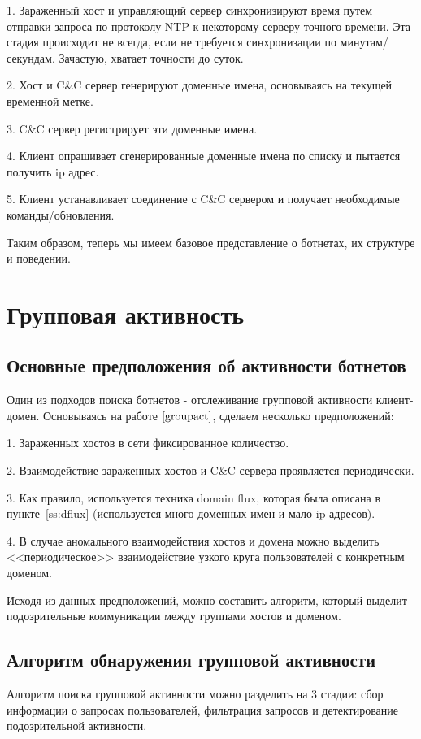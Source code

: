 \documentclass[a4paper,14pt]{extreport} %
\begin{document}
1. Зараженный хост и управляющий сервер синхронизируют время путем отправки запроса по протоколу NTP к некоторому серверу точного времени. Эта стадия происходит не всегда, если не требуется синхронизации по минутам/секундам. Зачастую, хватает точности до суток.
	
2. Хост и C\&C сервер генерируют доменные имена, основываясь на текущей временной метке.
	
3. C\&C сервер регистрирует эти доменные имена.
	
4. Клиент опрашивает сгенерированные доменные имена по списку и пытается получить ip адрес.
	
5. Клиент устанавливает соединение с C\&C сервером и получает необходимые команды/обновления.
	
Таким образом, теперь мы имеем базовое представление о ботнетах, их структуре и поведении.

\chapter{Групповая активность}
\label{chap:groupact}
\section{Основные предположения об активности ботнетов}
Один из подходов поиска ботнетов - отслеживание групповой активности клиент-домен. Основываясь на работе $\cite{groupact}$, сделаем несколько предположений:
	
1. Зараженных хостов в сети фиксированное количество.
	
2. Взаимодействие зараженных хостов и C\&C сервера проявляется периодически.
	
3. Как правило, используется техника domain flux, которая была описана в пункте~\ref{ss:dflux} (используется много доменных имен и мало ip адресов).

4. В случае аномального взаимодействия хостов и домена можно выделить <<периодическое>> взаимодействие узкого круга пользователей с конкретным доменом.
	
Исходя из данных предположений, можно составить алгоритм, который выделит подозрительные коммуникации между группами хостов и доменом.
	
\section{Алгоритм обнаружения групповой активности}
	
Алгоритм поиска групповой активности можно разделить на 3 стадии: сбор информации о запросах пользователей, фильтрация запросов и детектирование подозрительной активности. 
	
\end{document}
